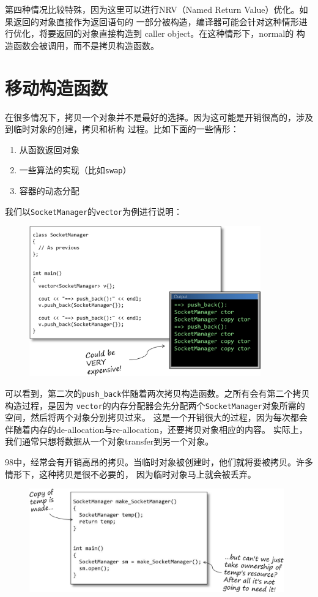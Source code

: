 \documentclass[12pt]{article}
\newcommand{\CC}{C\nolinebreak\hspace{-.05em}\raisebox{.4ex}{\tiny\bf +}%
\nolinebreak\hspace{-.10em}\raisebox{.4ex}{\tiny\bf +}}
\begin{document}
\indent{}第四种情况比较特殊，因为这里可以进行NRV（Named Return Value）优化。如果返回的对象直接作为返回语句的
一部分被构造，编译器可能会针对这种情形进行优化，将要返回的对象直接构造到 caller object。在这种情形下，normal的
构造函数会被调用，而不是拷贝构造函数。

\section{移动构造函数}
\indent{}在很多情况下，拷贝一个对象并不是最好的选择。因为这可能是开销很高的，涉及到临时对象的创建，拷贝和析构
过程。比如下面的一些情形：
\begin{enumerate}
    \item 从函数返回对象
    \item 一些算法的实现（比如\texttt{swap}）
    \item 容器的动态分配
\end{enumerate}
\noindent{}我们以\texttt{SocketManager}的\texttt{vector}为例进行说明：
\begin{figure}[h]
\centering
\includegraphics[width=10cm]{./imgs/image.MP3AS0.png}
\end{figure}

\indent{}可以看到，第二次的\texttt{push\_back}伴随着两次拷贝构造函数。之所有会有第二个拷贝构造过程，是因为
\texttt{vector}的内存分配器会先分配两个\texttt{SocketManager}对象所需的空间，然后将两个对象分别拷贝过来。
这是一个开销很大的过程，因为每次都会伴随着内存的de-allocation与re-allocation，还要拷贝对象相应的内容。
实际上，我们通常只想将数据从一个对象transfer到另一个对象。

\indent{}{\CC}98中，经常会有开销高昂的拷贝。当临时对象被创建时，他们就将要被拷贝。许多情形下，这种拷贝是很不必要的，
因为临时对象马上就会被丢弃。

\begin{figure}[!h]
\centering
\includegraphics[width=11cm]{./imgs/image.FNFHS0.png}
\end{figure}
\end{document}
